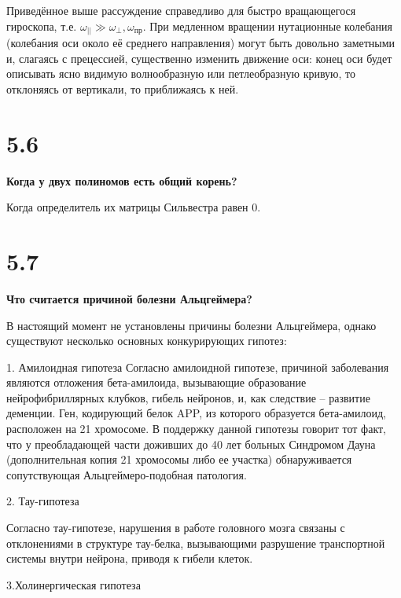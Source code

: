 \documentclass[a4paper,14pt]{article}
\begin{document}
Приведённое выше рассуждение справедливо для быстро вращающегося гироскопа, т.е. $\omega_{||} \gg \omega_{\perp}, \omega_{пр}$. При медленном вращении нутационные колебания (колебания оси около её среднего направления) могут быть довольно заметными и, слагаясь с прецессией, существенно изменить движение оси: конец оси будет описывать ясно видимую волнообразную или петлеобразную кривую, то отклоняясь от вертикали, то приближаясь к ней.

\section*{5.6}

\begin{center}
	\LARGE{\textbf{Когда у двух полиномов есть общий корень?}}\\
\end{center}

Когда определитель их матрицы Сильвестра равен 0.

\section*{5.7}

\begin{center}
	\LARGE{\textbf{Что считается причиной болезни Альцгеймера?}}\\
\end{center}

В настоящий момент не установлены причины болезни Альцгеймера, однако существуют несколько основных конкурирующих гипотез:

1. Амилоидная гипотеза Согласно амилоидной гипотезе, причиной заболевания являются отложения бета-амилоида, вызывающие образование нейрофибриллярных клубков, гибель нейронов, и, как следствие – развитие деменции. Ген, кодирующий белок APP, из которого образуется бета-амилоид, расположен на 21 хромосоме. В поддержку данной гипотезы говорит тот факт, что у преобладающей части доживших до 40 лет больных Синдромом Дауна (дополнительная копия 21 хромосомы либо ее участка) обнаруживается сопутствующая Альцгеймеро-подобная патология.

2. Тау-гипотеза

Согласно тау-гипотезе, нарушения в работе головного мозга связаны с отклонениями в структуре тау-белка, вызывающими разрушение транспортной системы внутри нейрона, приводя к гибели клеток.

3.Холинергическая гипотеза
\end{document}

